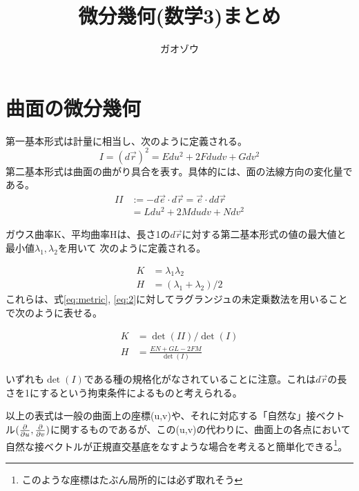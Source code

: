 \documentclass[uplatex,dvipdfmx]{jsarticle}
\title{微分幾何(数学3)まとめ}
\author{ガオゾウ}
\begin{document}
\maketitle
\section*{曲面の微分幾何}
第一基本形式は計量に相当し、次のように定義される。
\begin{equation}
    I = (d\vec{r})^2 = Edu^2 + 2Fdudv + G dv^2    \label{eq:metric}
\end{equation}
第二基本形式は曲面の曲がり具合を表す。具体的には、面の法線方向の変化量である。
\begin{align}
    II &:= -d\vec{e}\cdot d\vec{r} = \vec{e}\cdot dd\vec{r} \\ \nonumber
     &= Ldu^2 + 2Mdudv + Ndv^2   \label{eq:2}
\end{align}

ガウス曲率K、平均曲率Hは、長さ1の$d\vec{r}$に対する第二基本形式の値の最大値と最小値$\lambda_1, \lambda_2$を用いて
次のように定義される。

\begin{align}
    K &= \lambda_1\lambda_2 \\
    H &= (\lambda_1 + \lambda_2)/2   
\end{align}
これらは、式\ref{eq:metric}, \ref{eq:2}に対してラグランジュの未定乗数法を用いることで次のように表せる。

\begin{align}
    K &= \det(II)/\det(I) \\ \label{eq:gauss}
    H &= \frac{EN+GL-2FM}{\det(I)}
\end{align}

いずれも$\det(I)$である種の規格化がなされていることに注意。これは$d\vec{r}$の長さを1にするという拘束条件によるものと考えられる。

以上の表式は一般の曲面上の座標(u,v)や、それに対応する「自然な」接ベクトル$(\frac{\partial }{\partial u}, \frac{\partial }{\partial v})$に関するものであるが、この(u,v)の代わりに、曲面上の各点において自然な接ベクトルが正規直交基底をなすような場合を考えると簡単化できる\footnote{このような座標はたぶん局所的には必ず取れそう}。
\end{document}
